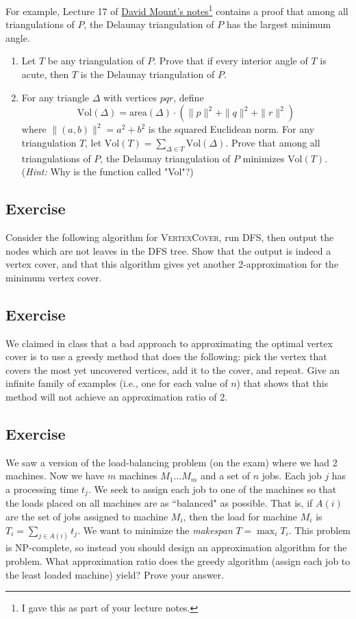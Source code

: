 \documentclass{article}
\newcounter{counter}
\newcommand{\Exercise}{Exercise \stepcounter{counter}\thecounter}
\begin{document}
    \vspace{3mm}
    For example, Lecture 17 of \href{https://www.cs.umd.edu/~mount/754/Lects/754lects.pdf}{David Mount's notes}\footnote{I gave this as part of your lecture notes.} contains a proof that among all triangulations of $P$, the Delaunay triangulation of $P$ has the largest minimum angle.
    \begin{enumerate}[label=(\alph*)]
        \item Let $T$ be any triangulation of $P$. Prove that if every interior angle of $T$ is acute, then $T$ is the Delaunay triangulation of $P$.
        \item For any triangle $\Delta$ with vertices $pqr$, define
        \[ \text{Vol}(\Delta) = \text{area}(\Delta) \cdot (\|p\|^2 + \|q\|^2 + \|r\|^2) \] where $\|(a, b)\|^2 = a^2 + b^2$ is the squared Euclidean norm. For any triangulation $T$, let $\text{Vol}(T) = \sum_{\Delta \in T} \text{Vol}(\Delta)$. Prove that among all triangulations of $P$, the Delaunay triangulation of $P$ minimizes $\text{Vol}(T)$. (\textit{Hint:} Why is the function called "Vol"?)
    \end{enumerate}

\subsection*{\Exercise}
    Consider the following algorithm for \textsc{VertexCover}, run \textsc{DFS}, then output the nodes which are not leaves in the \textsc{DFS} tree. Show that the output is indeed a vertex cover, and that this algorithm gives yet another 2-approximation for the minimum vertex cover.
  
\subsection*{\Exercise}
    We claimed in class that a bad approach to approximating the optimal vertex cover is to use a greedy method that does the following: pick the vertex that covers the most yet uncovered vertices, add it to the cover, and repeat. Give an infinite family of examples (i.e., one for each value of $n$) that shows that this method will not achieve an approximation ratio of 2.

\subsection*{\Exercise}
    We saw a version of the load-balancing problem (on the exam) where we had 2 machines.  Now we have $m$ machines $M_1 \ldots M_m$ and a set of $n$ jobs. Each job $j$ has a processing time $t_j$. We seek to assign each job to one of the machines so that the loads placed on all machines are as ``balanced" as possible. That is, if $A(i)$ are the set of jobs assigned to machine $M_i$, then the load for machine $M_i$ is $T_i = \sum_{j \in A(i)} t_j$. We want to minimize the \textit{makespan} $T = \max_i T_i$.  This problem is NP-complete, so instead you should design an approximation algorithm for the problem. What approximation ratio does the greedy algorithm (assign each job to the least loaded machine) yield? Prove your answer.
\end{document}
